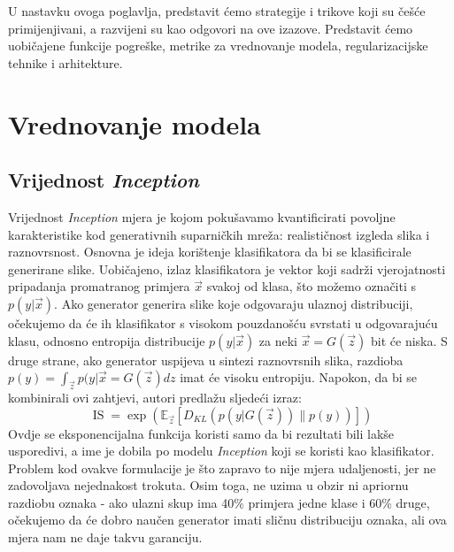 U nastavku ovoga poglavlja, predstavit ćemo strategije i trikove koji su češće primijenjivani, a razvijeni su kao odgovori na ove izazove. Predstavit ćemo uobičajene funkcije pogreške, metrike za vrednovanje modela, regularizacijske tehnike i arhitekture.

\section{Vrednovanje modela}
\subsection{Vrijednost \textit{Inception}}
Vrijednost \textit{Inception}  \citep{salimans2016improved} mjera je kojom pokušavamo kvantificirati povoljne karakteristike kod generativnih suparničkih mreža: realističnost izgleda slika i raznovrsnost. Osnovna je ideja korištenje klasifikatora da bi se klasificirale generirane slike. Uobičajeno, izlaz klasifikatora je vektor koji sadrži vjerojatnosti pripadanja promatranog primjera $\vec{x}$ svakoj od klasa, što možemo označiti s $p(y|\vec{x})$. Ako generator generira slike koje odgovaraju ulaznoj distribuciji, očekujemo da će ih klasifikator s visokom pouzdanošću svrstati u odgovarajuću klasu, odnosno entropija distribucije $p(y|\vec{x})$ za neki $\vec{x} = G(\vec{z})$ bit će niska. S druge strane, ako generator uspijeva u sintezi raznovrsnih slika, razdioba $p(y) = \int_{\vec{z}}p(y|\vec{x} = G(\vec{z})dz$ imat će visoku entropiju. Napokon, da bi se kombinirali ovi zahtjevi, autori predlažu sljedeći izraz:
\begin{equation}
	\operatorname*{IS} = \exp(\mathbb{E}_{\vec{z}} \left[D_{KL}(p(y|G(\vec{z}))\|p(y))\right])
\end{equation}
Ovdje se eksponencijalna funkcija koristi samo da bi rezultati bili lakše usporedivi, a ime je dobila po modelu \textit{Inception} koji se koristi kao klasifikator. Problem kod ovakve formulacije je što zapravo to nije mjera udaljenosti, jer ne zadovoljava nejednakost trokuta. Osim toga, ne uzima u obzir ni apriornu razdiobu oznaka - ako ulazni skup ima 40\% primjera jedne klase i 60\% druge, očekujemo da će dobro naučen generator imati sličnu distribuciju oznaka, ali ova mjera nam ne daje takvu garanciju. 

